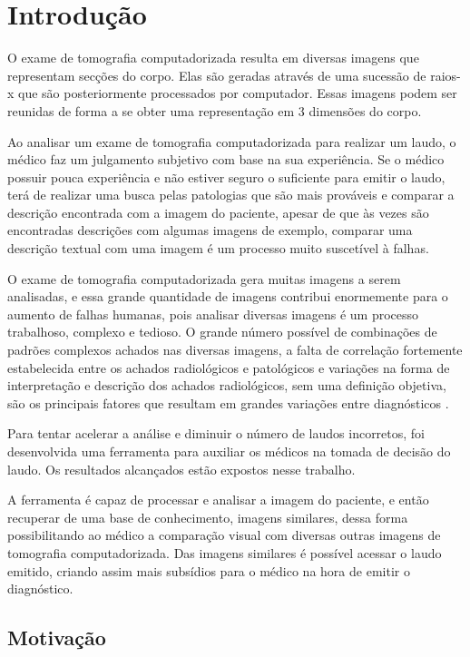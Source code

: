 \chapter{Introdução}

O exame de tomografia computadorizada resulta em diversas imagens que representam secções do corpo. Elas são geradas através de uma sucessão de raios-x que são posteriormente processados por computador. Essas imagens podem ser reunidas de forma a se obter uma representação em 3 dimensões do corpo.

Ao analisar um exame de tomografia computadorizada para realizar um laudo, o médico faz um julgamento subjetivo com base na sua experiência. Se o médico possuir pouca experiência e não estiver seguro o suficiente para emitir o laudo, terá de realizar uma busca pelas patologias que são mais prováveis e comparar a descrição encontrada com a imagem do paciente, apesar de que às vezes são encontradas descrições com algumas imagens de exemplo, comparar uma descrição textual com uma imagem é um processo muito suscetível à falhas.

O exame de tomografia computadorizada gera muitas imagens a serem analisadas, e essa grande quantidade de imagens contribui enormemente para o aumento de falhas humanas, pois analisar diversas imagens é um processo trabalhoso, complexo e tedioso. O grande número possível de combinações de padrões complexos achados nas diversas imagens, a falta de correlação fortemente estabelecida entre os achados radiológicos e patológicos e variações na forma de interpretação e descrição dos achados radiológicos, sem uma definição objetiva, são os principais fatores que resultam em grandes variações entre diagnósticos \cite{uchiyama}.

Para tentar acelerar a análise e diminuir o número de laudos incorretos, foi desenvolvida uma ferramenta para auxiliar os médicos na tomada de decisão do laudo. Os resultados alcançados estão expostos nesse trabalho.

A ferramenta é capaz de processar e analisar a imagem do paciente, e então recuperar de uma base de conhecimento, imagens similares, dessa forma possibilitando ao médico a comparação visual com diversas outras imagens de tomografia computadorizada. Das imagens similares é possível acessar o laudo emitido, criando assim mais subsídios para o médico na hora de emitir o diagnóstico.

\section{Motivação}

